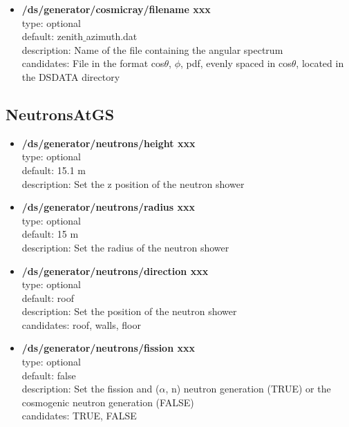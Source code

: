 \documentclass[twocolumn, 10pt]{article}
\begin{document}
\begin{itemize}
\item \textbf{/ds/generator/cosmicray/filename xxx}\\
type: optional \\
default: zenith$\_$azimuth.dat \\
description: Name of the file containing the angular spectrum\\
candidates: File in the format cos$\theta$, $\phi$, pdf, evenly spaced in cos$\theta$, located in the DSDATA directory\\
\end{itemize}


\subsection{NeutronsAtGS}
\begin{itemize}

\item \textbf{/ds/generator/neutrons/height xxx}\\
type: optional \\
default: 15.1 m \\
description: Set the z position of the neutron shower\\

\item \textbf{/ds/generator/neutrons/radius xxx}\\
type: optional\\
default: 15 m\\
description: Set the radius of the neutron shower \\

\item \textbf{/ds/generator/neutrons/direction xxx}\\
type: optional \\
default: roof \\
description: Set the position of the neutron shower\\
candidates: roof, walls, floor\\

\item \textbf{/ds/generator/neutrons/fission xxx}\\
type: optional \\
default: false\\
description: Set the fission and ($\alpha$, n) neutron generation (TRUE) or the cosmogenic neutron generation (FALSE)\\
candidates: TRUE, FALSE \\

\end{itemize}
\end{document}
